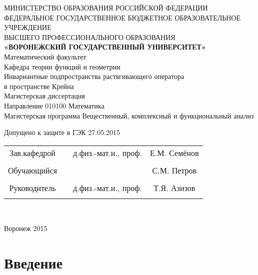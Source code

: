 \documentclass[a4paper]{article}
\newcommand{\universityname}{ВОРОНЕЖСКИЙ ГОСУДАРСТВЕННЫЙ УНИВЕРСИТЕТ}
\newcommand{\facultyname}{Математический факультет}
\newcommand{\departmentname}{Кафедра теории функций и  геометрии}
\newcommand{\thesistitle}{Инвариантные подпространства растягивающего оператора\\ в пространстве Крейна}
\newcommand{\thesisdirection}{010100 Математика}
\newcommand{\programname}{Вещественный, комплексный и функциональный анализ}
\newcommand{\defenseDate}{27.05.2015}
\newcommand{\studentName}{С.М. Петров}
\newcommand{\supervisorName}{Т.Я. Азизов}
\newcommand{\supervisorDegree}{д.физ.-мат.н., проф.}
\newcommand{\departmentHeadName}{Е.М. Семёнов}
\newcommand{\departmentHeadDegree}{д.физ.-мат.н.,  проф.}
\newcommand{\yearOfCompletion}{2015}
\begin{document}

\begin{center}
\hfill \break
\large{МИНИСТЕРСТВО ОБРАЗОВАНИЯ РОССИЙСКОЙ ФЕДЕРАЦИИ}\\
\footnotesize{ФЕДЕРАЛЬНОЕ ГОСУДАРСТВЕННОЕ БЮДЖЕТНОЕ ОБРАЗОВАТЕЛЬНОЕ УЧРЕЖДЕНИЕ}\\
\footnotesize{ВЫСШЕГО ПРОФЕССИОНАЛЬНОГО ОБРАЗОВАНИЯ}\\
\small{\textbf{«\universityname»}}\\
\hfill \break
\normalsize{\facultyname}\\
    \hfill \break
\normalsize{\departmentname}\\
\hfill\break
\hfill \break
\hfill \break
\hfill \break
\large{\thesistitle}\\
\hfill \break
\hfill \break
\hfill \break
\normalsize{Магистерская диссертация\\
\hfill \break
Направление  \thesisdirection\\
\hfill \break
Магистерская программа \programname}\\
\hfill \break
\hfill \break
\end{center}

\normalsize{ \hspace{28pt} Допущено к защите в ГЭК  \defenseDate} \hfill \break
\hfill \break

\normalsize{
\begin{tabular}{cccc}
Зав.кафедрой & \underline{\hspace{3cm}} &  \departmentHeadDegree & \departmentHeadName \\\\
Обучающийся & \underline{\hspace{3cm}} & &\studentName \\\\
Руководитель & \underline{\hspace{3cm}}& \supervisorDegree & \supervisorName \\\\
\end{tabular}
}\\
\hfill \break
\hfill \break
\begin{center} Воронеж \yearOfCompletion \end{center}
\thispagestyle{empty} %


\newpage

\tableofcontents %
\newpage

\newpage
\section{Введение}
\end{document}

